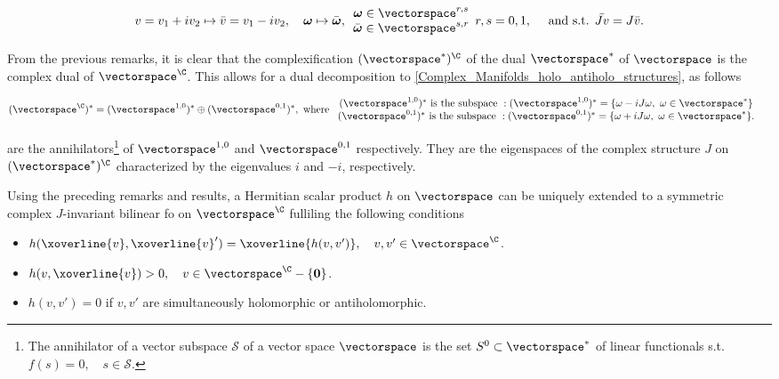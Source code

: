 \documentclass{homework}
\begin{document}
\begin{equation}
    v = v_1 + iv_2 \mapsto \bar{v} = v_1 - i v_2, \quad \bm{\omega} \mapsto \bar{\bm{\omega}}, \begin{array}{cc}
         \bm{\omega} \in \vectorspace^{r,s} \\
         \bar{\bm{\omega}} \in \vectorspace^{s,r}
    \end{array} r ,s = 0,1, \quad \textnormal{ and s.t. } \bar{Jv} = J \bar{v}.
\end{equation}

From the previous remarks, it is clear that the complexification $(\vectorspace^{*})^\C$ of the dual $\vectorspace^{*}$ of $\vectorspace$ is the complex dual of $\vectorspace^\C$. This allows for a dual decomposition to \cref{Complex_Manifolds_holo_antiholo_structures}, as follows 

\begin{equation} \label{Complex_Manifolds_holo_antiholo_dual_structures}
\begin{split}
    &(\vectorspace^\C)^{*} = (\vectorspace^{1,0})^{*} \oplus (\vectorspace^{0,1})^{*}, \textnormal{ where }\begin{array}{cc}
         \textnormal{$(\vectorspace^{1,0})^{*}$ is the subspace }: (\vectorspace^{1,0})^{*} = \{\omega - i J \omega, \blanky \omega \in \vectorspace^{*}\}  \\
         \textnormal{$(\vectorspace^{0,1})^{*}$ is the subspace }: (\vectorspace^{0,1})^{*} = \{\omega + i J \omega, \blanky \omega \in \vectorspace^{*}\}.
    \end{array}
\end{split}
\end{equation}

are the annihilators\footnote{
   The annihilator of a vector subspace $\mathcal{S}$ of a vector space $\vectorspace$ is the set $S^{0} \subset \vectorspace^{*}$ of linear functionals s.t. $f(s) = 0, \quad s \in \mathcal{S}$.
} of ${\vectorspace^{1,0}}$ and ${\vectorspace^{0,1}}$ respectively. They are the eigenspaces of the complex structure $J$ on $(\vectorspace^{*})^\C$ characterized by the eigenvalues $i$ and $-i$, respectively. \bigbreak

Using the preceding remarks and results, a Hermitian scalar product $h$ on $\vectorspace$ can be uniquely extended to a symmetric complex $J$-invariant bilinear fo on $\vectorspace^{\C}$ fulliling the following conditions 

\begin{itemize}
    \item $h(\xoverline{v}, \xoverline{v}') = \xoverline{h(v,v')}, \quad v,v' \in \vectorspace^\C$.
    \item $h(v, \xoverline{v}) > 0, \quad v \in \vectorspace^{\C} - \{{\bf 0}\}$.
    \item $h(v, v') = 0$ if $v,v'$ are simultaneously holomorphic or antiholomorphic. 
\end{itemize}
\end{document}
